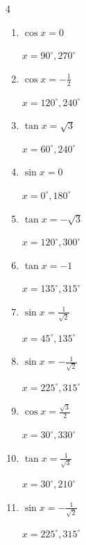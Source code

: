 \begin{multicols}{4}
\begin{enumerate}
        $\displaystyle x = 150^{\circ} , 330^{\circ}$

  \item $\displaystyle \cos{x}  = 0$

        $\displaystyle x = 90^{\circ} , 270^{\circ}$

\columnbreak %

  \item $\displaystyle \cos{x}  = -\frac{1}{2}$

        $\displaystyle x = 120^{\circ} , 240^{\circ}$

  \item $\displaystyle \tan{x}  = \sqrt{3}$

        $\displaystyle x = 60^{\circ} , 240^{\circ}$

  \item $\displaystyle \sin{x}  = 0$

        $\displaystyle x = 0^{\circ} , 180^{\circ}$

  \item $\displaystyle \tan{x}  = -\sqrt{3}$

        $\displaystyle x = 120^{\circ} , 300^{\circ}$

  \item $\displaystyle \tan{x}  = -1$

        $\displaystyle x = 135^{\circ} , 315^{\circ}$

  \item $\displaystyle \sin{x}  = \frac{1}{\sqrt{2}}$

        $\displaystyle x = 45^{\circ} , 135^{\circ}$

  \item $\displaystyle \sin{x}  = -\frac{1}{\sqrt{2}}$

        $\displaystyle x = 225^{\circ} , 315^{\circ}$

  \item $\displaystyle \cos{x}  = \frac{\sqrt{3}}{2}$

        $\displaystyle x = 30^{\circ} , 330^{\circ}$

  \item $\displaystyle \tan{x}  = \frac{1}{\sqrt{3}}$

        $\displaystyle x = 30^{\circ} , 210^{\circ}$

  \item $\displaystyle \sin{x}  = -\frac{1}{\sqrt{2}}$

        $\displaystyle x = 225^{\circ} , 315^{\circ}$


\end{enumerate}
\end{multicols}
